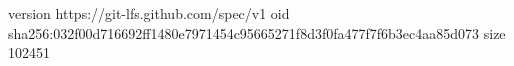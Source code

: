 version https://git-lfs.github.com/spec/v1
oid sha256:032f00d716692ff1480e7971454c95665271f8d3f0fa477f7f6b3ec4aa85d073
size 102451
